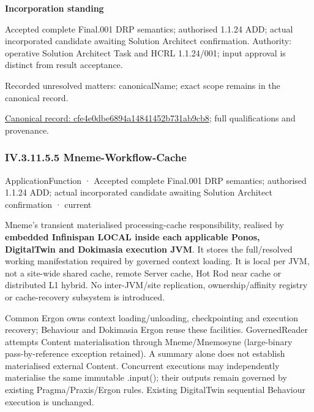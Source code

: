 \par\medskip\textbf{Incorporation standing}\par


Accepted complete Final.001 DRP semantics; authorised 1.1.24 ADD; actual incorporated candidate awaiting Solution Architect confirmation. Authority: operative Solution Architect Task and HCRL 1.1.24/001; input approval is distinct from result acceptance.


{\small Recorded unresolved matters: canonicalName; exact scope remains in the canonical record.}\par
{\footnotesize \href{../../../../continuum/application/application-function/cfe4e0dbe6894a14841452b731ab9cb8.md}{Canonical record: cfe4e0dbe6894a14841452b731ab9cb8}; full qualifications and provenance.}\par
\subsubsection*{IV.3.11.5.5 Mneme-Workflow-Cache}
\label{navigation:IV.3.11.5.5}

\label{element:0bddade1309e426aa84d0cd97c35742a}
{\small ApplicationFunction · Accepted complete Final.001 DRP semantics; authorised 1.1.24 ADD; actual incorporated candidate awaiting Solution Architect confirmation · current}\par

Mneme's transient materialised processing-cache responsibility, realised by \textbf{embedded Infinispan LOCAL inside each applicable Ponos, DigitalTwin and Dokimasia execution JVM}. It stores the full/resolved working manifestation required by governed context loading. It is local per JVM, not a site-wide shared cache, remote Server cache, Hot Rod near cache or distributed L1 hybrid. No inter-JVM/site replication, ownership/affinity registry or cache-recovery subsystem is introduced.



Common Ergon owns context loading/unloading, checkpointing and execution recovery; Behaviour and Dokimasia Ergon reuse these facilities. GovernedReader attempts Content materialisation through Mneme/Mnemosyne (large-binary pass-by-reference exception retained). A summary alone does not establish materialised external Content. Concurrent executions may independently materialise the same immutable .input(); their outputs remain governed by existing Pragma/Praxis/Ergon rules. Existing DigitalTwin sequential Behaviour execution is unchanged.



